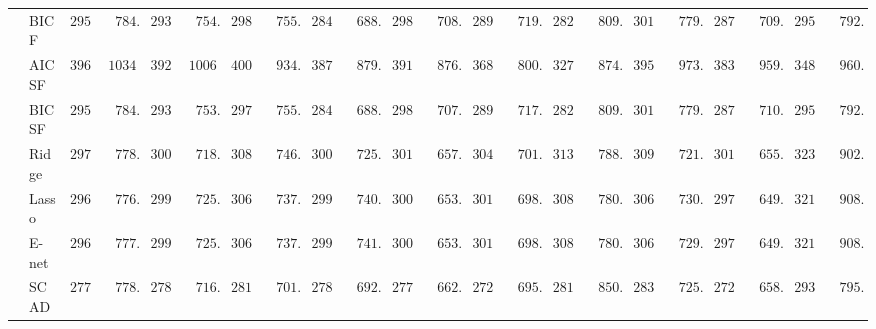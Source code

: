 \begin{tabular}{ll|ll|llllll|llllll|llllll}
 & BIC F  & $2951.76$ & $\phantom{0}784.90$ & $2934.06$ & $\phantom{0}754.07$ & $2980.67$ & $\phantom{0}755.40$ & $2846.57$ & $\phantom{0}688.43$ & $2989.55$ & $\phantom{0}708.58$ & $2891.67$ & $\phantom{0}719.21$ & $2826.02$ & $\phantom{0}809.89$ & $3019.70$ & $\phantom{0}779.22$ & $2874.62$ & $\phantom{0}709.38$ & $2953.00$ & $\phantom{0}792.22$ \\
 & AIC SF  & $3965.74$ & $1034.64$ & $3923.92$ & $1006.42$ & $4002.54$ & $\phantom{0}934.25$ & $3874.43$ & $\phantom{0}879.36$ & $3917.05$ & $\phantom{0}876.87$ & $3680.04$ & $\phantom{0}800.12$ & $3271.11$ & $\phantom{0}874.17$ & $3952.42$ & $\phantom{0}973.09$ & $3831.09$ & $\phantom{0}959.33$ & $3486.52$ & $\phantom{0}960.03$ \\
 & BIC SF  & $2951.76$ & $\phantom{0}784.90$ & $2933.16$ & $\phantom{0}753.68$ & $2979.63$ & $\phantom{0}755.13$ & $2846.57$ & $\phantom{0}688.43$ & $2988.18$ & $\phantom{0}707.78$ & $2890.98$ & $\phantom{0}717.42$ & $2826.24$ & $\phantom{0}809.69$ & $3019.70$ & $\phantom{0}779.22$ & $2875.94$ & $\phantom{0}710.50$ & $2953.19$ & $\phantom{0}792.28$ \\
 & Ridge  & $2977.85$ & $\phantom{0}778.14$ & $3009.38$ & $\phantom{0}718.48$ & $3087.92$ & $\phantom{0}746.63$ & $3009.50$ & $\phantom{0}725.84$ & $3013.87$ & $\phantom{0}657.20$ & $3045.43$ & $\phantom{0}701.60$ & $3137.18$ & $\phantom{0}788.02$ & $3092.40$ & $\phantom{0}721.86$ & $3011.63$ & $\phantom{0}655.71$ & $3236.02$ & $\phantom{0}902.18$ \\
 & Lasso  & $2968.70$ & $\phantom{0}776.01$ & $2997.76$ & $\phantom{0}725.75$ & $3061.34$ & $\phantom{0}737.42$ & $2999.97$ & $\phantom{0}740.78$ & $3001.85$ & $\phantom{0}653.98$ & $3013.21$ & $\phantom{0}698.27$ & $3081.30$ & $\phantom{0}780.43$ & $3061.91$ & $\phantom{0}730.15$ & $2973.05$ & $\phantom{0}649.07$ & $3213.22$ & $\phantom{0}908.17$ \\
 & E-net  & $2968.99$ & $\phantom{0}777.76$ & $2998.53$ & $\phantom{0}725.22$ & $3063.43$ & $\phantom{0}737.10$ & $2999.82$ & $\phantom{0}741.30$ & $3002.98$ & $\phantom{0}653.93$ & $3014.77$ & $\phantom{0}698.62$ & $3084.40$ & $\phantom{0}780.58$ & $3062.75$ & $\phantom{0}729.56$ & $2975.39$ & $\phantom{0}649.38$ & $3213.99$ & $\phantom{0}908.19$ \\
 & SCAD  & $2770.83$ & $\phantom{0}778.44$ & $2783.32$ & $\phantom{0}716.44$ & $2818.31$ & $\phantom{0}701.84$ & $2788.38$ & $\phantom{0}692.96$ & $2779.77$ & $\phantom{0}662.54$ & $2724.61$ & $\phantom{0}695.82$ & $2817.28$ & $\phantom{0}850.66$ & $2832.96$ & $\phantom{0}725.45$ & $2722.78$ & $\phantom{0}658.93$ & $2932.99$ & $\phantom{0}795.94$ \\

\end{tabular}
